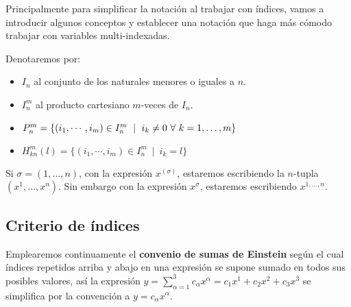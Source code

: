 Principalmente para simplificar la notación al trabajar con índices, vamos
a introducir algunos conceptos y establecer una notación que haga más cómodo
trabajar con variables multi-indexadas.

\begin{notation}
  Denotaremos por:
  \begin{itemize}
    \item $I_n$ al conjunto de los naturales menores o iguales a $n$.
    \item $I_n^m$ al producto cartesiano $m$-veces de $I_n$.
    \item $P_n^m=\{(i_1,\cdots,i_m)\in I_n^m\ \mid \ i_k\neq 0\ \forall\ \indexdots{k}{1}{m}\}$
    \item $H_{kn}^m(l)=\{(i_1,\cdots,i_m)\in I_n^m\ \mid \ i_k=l\}$
  \end{itemize}
\end{notation}

\begin{notation}
  Si $\sigma=(1,\ldots,n)$, con la expresión $x^{(\sigma)}$, estaremos escribiendo la $n$-tupla $(x^1,\ldots,x^n)$.
  Sin embargo con la expresión $x^\sigma$, estaremos escribiendo $x^{1,\ldots,n}$.
\end{notation}

\subsection{Criterio de índices}\label{subsec:criterio-de-indices}

Emplearemos continuamente el \textbf{convenio de sumas de Einstein} según el cual
índices repetidos arriba y abajo en una expresión se supone sumado en todos sus posibles valores,
así la expresión $y=\sum_{\alpha=1}^3 c_\alpha x^\alpha=c_1 x^1 + c_2 x^2 + c_3 x^3$
se simplifica por la convención a $y = c_\alpha x^\alpha$.
